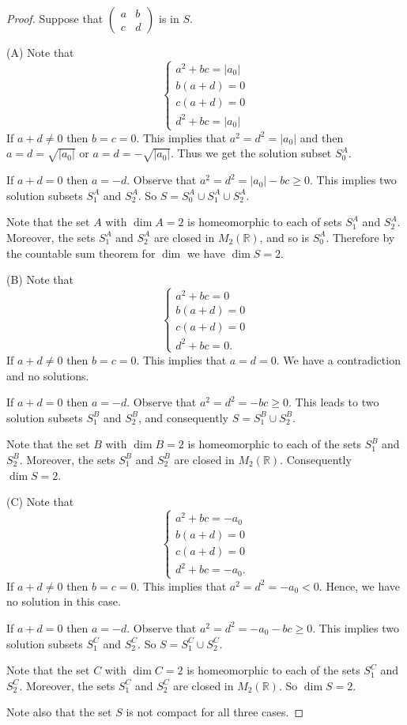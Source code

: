 \documentclass[12pt]{amsart}
\theoremstyle{plain}
\theoremstyle{definition}
\begin{document}
\begin{proof}
Suppose that $ \left(\begin{array}{rr}  a & b \\ c & d  \end{array}\right)$ is in $S.$

(A) Note that
$$
\left\{\begin{array}{l} a^2+bc= |a_0| \\ b(a+d) = 0\\c(a+d) = 0 \\  d^2+bc= |a_0|\end{array}\right.
$$
If $a+d \ne 0$ then $b=c=0$. This implies that $a^2 = d^2 = |a_0|$ and then $a= d = \sqrt{|a_0|}$ or 
$a= d = -\sqrt{|a_0|}$. Thus we get the solution subset $S^A_0$. 

\noindent 
If $a+d = 0$ then $a= -d$. Observe that $a^2 = d^2 = |a_0| -bc \geq 0$. This implies
two  solution subsets $S^A_1$ and $S^A_2$.  So $S = S^A_0 \cup S^A_1 \cup S^A_2$.

Note that the set $A$ with $\dim A = 2$ is homeomorphic to each of sets $S^A_1$ and $S^A_2$. Moreover, the sets 
$S^A_1$ and $S^A_2$ are closed in $M_2(\mathbb R)$, and so is $S^A_0$. Therefore by the countable sum theorem for $\dim$ we have  $\dim S = 2.$

(B) Note that 
$$
\left\{\begin{array}{l} a^2+bc= 0 \\ b(a+d) = 0\\c(a+d) = 0 \\  d^2+bc= 0.  \end{array}\right.
$$
If $a+d \ne 0$ then $b=c=0$. This implies that $a =d =0$. We have a contradiction and no solutions.

\noindent 
If $a+d = 0$ then $a= -d$. Observe that $a^2 = d^2 =  -bc \geq 0$. This leads to
two  solution subsets $S^B_1$ and $S^B_2$, and consequently $S = S^B_1 \cup S^B_2$.

Note that the set $B$ with $\dim B = 2$ is homeomorphic to each of the sets $S^B_1$ and $S^B_2$. Moreover, the sets 
$S^B_1$ and $S^B_2$ are closed in $M_2(\mathbb R)$. Consequently $\dim S = 2.$

(C) Note that
$$
\left\{\begin{array}{l} a^2+bc= -a_0 \\ b(a+d) = 0\\c(a+d) = 0 \\  d^2+bc= -a_0.  \end{array}\right.
$$
If $a+d \ne 0$ then $b=c=0$. This implies that $a^2 = d^2 = -a_0 < 0$. Hence, we have no solution in this case.

\noindent 
If $a+d = 0$ then $a= -d$. Observe that $a^2 = d^2 = -a_0 -bc \geq 0$. This implies
two  solution subsets $S^C_1$ and $S^C_2$.  So $S = S^C_1 \cup S^C_2$.

Note that the set $C$ with $\dim C = 2$ is homeomorphic to each of the sets $S^C_1$ and $S^C_2$. Moreover, the sets 
$S^C_1$ and $S^C_2$ are closed in $M_2(\mathbb R)$. So  $\dim S = 2.$

Note also that the set $S$ is not compact for all three cases. 
\end{proof}
\end{document}
